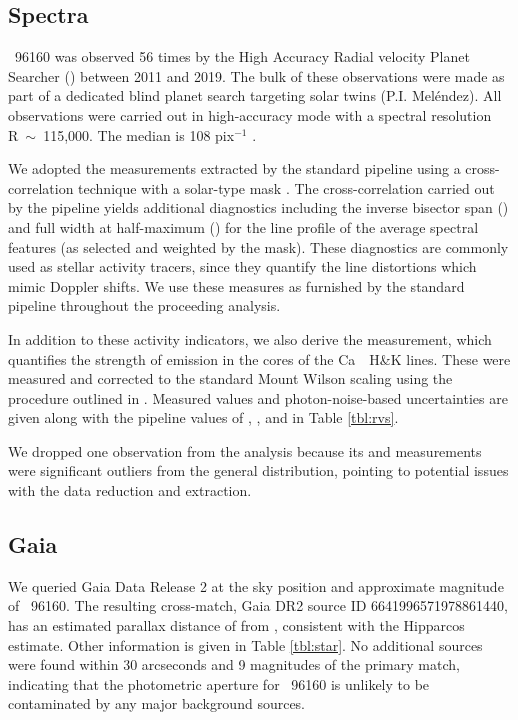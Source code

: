 \documentclass[modern]{aastex62}
\newcommand{\hoststar}{\acronym{HIP}\ 96160\xspace}
\begin{document}
\subsection{Spectra}

\hoststar was observed 56 times by the High Accuracy Radial velocity Planet Searcher (\HARPS) between 2011 and 2019. 
The bulk of these observations were made as part of a dedicated blind planet search targeting solar twins (P.I. Mel\'endez). 
All observations were carried out in high-accuracy mode with a spectral resolution R~$\sim$~115,000. 
The median \SNR is 108 pix$^{-1}$ . 

We adopted the \RV measurements extracted by the standard \HARPS pipeline using a cross-correlation technique with a solar-type mask \citep{Pepe2002}. 
The cross-correlation carried out by the pipeline yields additional diagnostics including the inverse bisector span (\BIS) and full width at half-maximum (\FWHM) for the line profile of the average spectral features (as selected and weighted by the mask). 
These diagnostics are commonly used as stellar activity tracers, since they quantify the line distortions which mimic Doppler shifts. 
We use these measures as furnished by the standard pipeline throughout the proceeding analysis.

In addition to these activity indicators, we also derive the \shk measurement, which quantifies the strength of emission in the cores of the Ca~\II~H\&K lines.
These were measured and corrected to the standard Mount Wilson scaling using the procedure outlined in \citet{Lovis2009}. 
Measured \shk values and photon-noise-based uncertainties are given along with the pipeline values of \RV, \BIS, and \FWHM in Table \ref{tbl:rvs}.

We dropped one observation from the analysis because its \BIS and \FWHM measurements were significant outliers from the general distribution, pointing to potential issues with the data reduction and \RV extraction.

\subsection{Gaia}

We queried Gaia Data Release 2 \citep{gaia} at the sky position and approximate magnitude of \hoststar. 
The resulting cross-match, Gaia DR2 source ID 6641996571978861440, has an estimated parallax distance of  from \citet{BailerJones}, consistent with the Hipparcos estimate. 
Other \gaia information is given in Table \ref{tbl:star}. 
No additional sources were found within 30 arcseconds and 9 magnitudes of the primary match, indicating that the \TESS photometric aperture for \hoststar is unlikely to be contaminated by any major background sources.
\end{document}
